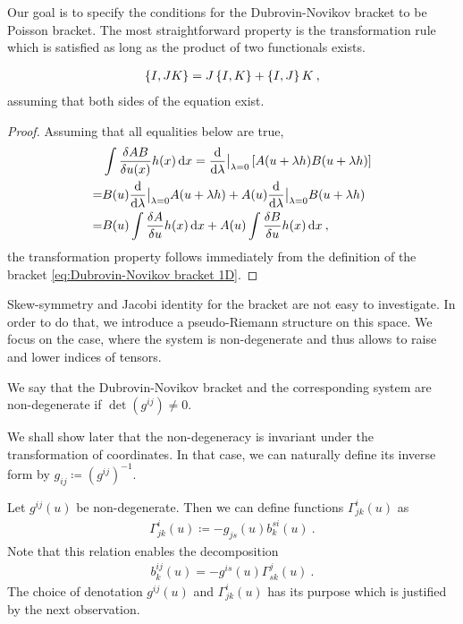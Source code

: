 Our goal is to specify the conditions for the Dubrovin-Novikov bracket to be Poisson bracket. The most straightforward property is the transformation rule which is satisfied as long as the product of two functionals exists.

\begin{proposition}
    \begin{align}
        \left \lbrace I,JK \right \rbrace = J \left \lbrace I,K \right \rbrace + \left \lbrace I,J \right \rbrace K \:,
    \end{align}
    assuming that both sides of the equation exist.
\end{proposition}
\begin{proof}
    Assuming that all equalities below are true,
    \begin{align}
        &\int \frac{\delta AB}{\delta u(x)} h(x) \, \mathrm{d} x = \frac{\mathrm{d}}{\mathrm{d}\lambda} \big|_{\lambda = 0} \left[ A(u+ \lambda h) B(u+ \lambda h) \right] \nonumber
        \\ =& B(u) \frac{\mathrm{d}}{\mathrm{d}\lambda} \big|_{\lambda = 0} A(u+ \lambda h) + A(u) \frac{\mathrm{d}}{\mathrm{d}\lambda} \big|_{\lambda = 0} B(u+ \lambda h) \nonumber
        \\ =& B(u) \int \frac{\delta A}{\delta u} h(x) \, \mathrm{d} x + A(u) \int \frac{\delta B}{\delta u} h(x) \, \mathrm{d} x \:,
    \end{align}
    the transformation property follows immediately from the definition of the bracket \eqref{eq:Dubrovin-Novikov bracket 1D}.
\end{proof}


Skew-symmetry and Jacobi identity for the bracket are not easy to investigate. In order to do that, we introduce a pseudo-Riemann structure on this space. We focus on the case, where the system is non-degenerate and thus allows to raise and lower indices of tensors.

\begin{definition}
    We say that the Dubrovin-Novikov bracket and the corresponding system are non-degenerate if $\det(g^{ij}) \neq 0$.
\end{definition}

 We shall show later that the non-degeneracy is invariant under the transformation of coordinates. In that case, we can naturally define its inverse form by $g_{ij} \coloneqq (g^{ij})^{-1}$.

Let $g^{ij}(u)$ be non-degenerate. Then we can define functions $\Gamma^{i}_{jk}(u)$ as
\begin{align}
    \Gamma^i_{jk}(u) \coloneqq - g_{js}(u) b^{s i}_k(u) \:. \label{eq:Gamma=g*b}
\end{align}
Note that this relation enables the decomposition
\begin{align}
    b_k^{ij}(u) = -g^{is}(u) \Gamma^j_{sk}(u) \:. \label{eq:b=g*Gamma}
\end{align}
The choice of denotation $g^{ij}(u)$ and $\Gamma^{i}_{jk}(u)$ has its purpose which is justified by the next observation.

